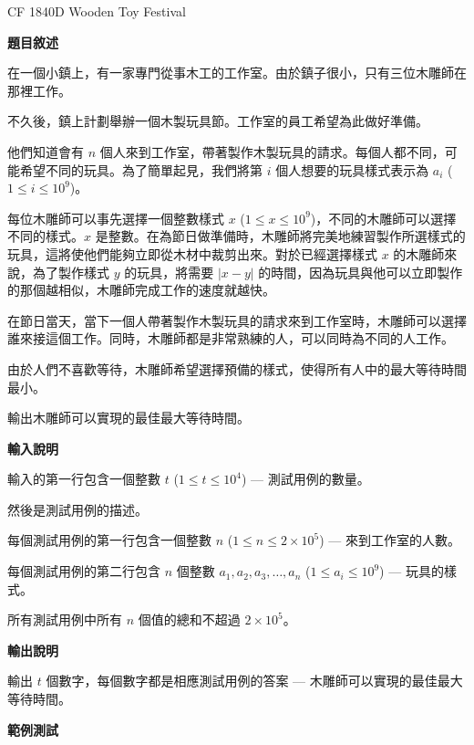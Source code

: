     \problem CF 1840D Wooden Toy Festival

    \textbf{題目敘述}

    在一個小鎮上，有一家專門從事木工的工作室。由於鎮子很小，只有三位木雕師在那裡工作。

    不久後，鎮上計劃舉辦一個木製玩具節。工作室的員工希望為此做好準備。
    
    他們知道會有 $n$ 個人來到工作室，帶著製作木製玩具的請求。每個人都不同，可能希望不同的玩具。為了簡單起見，我們將第 $i$ 個人想要的玩具樣式表示為 $a_i$ ($1 \le i \le 10^9$)。
    
    每位木雕師可以事先選擇一個整數樣式 $x$ ($1 \le x \le 10^9$)，不同的木雕師可以選擇不同的樣式。$x$ 是整數。在為節日做準備時，木雕師將完美地練習製作所選樣式的玩具，這將使他們能夠立即從木材中裁剪出來。對於已經選擇樣式 $x$ 的木雕師來說，為了製作樣式 $y$ 的玩具，將需要 $|x-y|$ 的時間，因為玩具與他可以立即製作的那個越相似，木雕師完成工作的速度就越快。
    
    在節日當天，當下一個人帶著製作木製玩具的請求來到工作室時，木雕師可以選擇誰來接這個工作。同時，木雕師都是非常熟練的人，可以同時為不同的人工作。
    
    由於人們不喜歡等待，木雕師希望選擇預備的樣式，使得所有人中的最大等待時間最小。
    
    輸出木雕師可以實現的最佳最大等待時間。

    \textbf{輸入說明}

    輸入的第一行包含一個整數 $t$ ($1 \le t \le 10^4$) — 測試用例的數量。

    然後是測試用例的描述。

    每個測試用例的第一行包含一個整數 $n$ ($1 \le n \le 2 \times 10^5$) — 來到工作室的人數。

    每個測試用例的第二行包含 $n$ 個整數 $a_1,a_2,a_3,\ldots,a_n$ ($1 \le a_i \le 10^9$) — 玩具的樣式。

    所有測試用例中所有 $n$ 個值的總和不超過 $2 \times 10^5$。

    \textbf{輸出說明}

    輸出 $t$ 個數字，每個數字都是相應測試用例的答案 — 木雕師可以實現的最佳最大等待時間。

    \textbf{範例測試}

